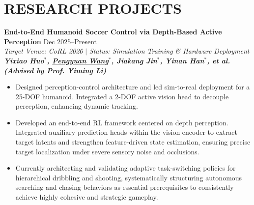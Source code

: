 \documentclass[a4paper,11pt]{article}
\begin{document}
\section{RESEARCH PROJECTS}

\textcolor{titleblue}{\textbf{End-to-End Humanoid Soccer Control via Depth-Based Active Perception}} \hfill Dec 2025--Present \\
\textit{Target Venue: CoRL 2026} $|$ \textit{Status: Simulation Training \& Hardware Deployment} \\
\textit{\textbf{Yixiao Huo$^*$, \underline{Pengyuan Wang$^*$}, Jiakang Jin$^*$, Yinan Han$^*$, et al. (Advised by Prof. Yiming Li)}}
\begin{itemize}[nosep,after=\strut, leftmargin=1.5em, itemsep=3pt,label=$\bullet$]
\item Designed perception-control architecture and led sim-to-real deployment for a 25-DOF humanoid. Integrated a 2-DOF active vision head to decouple perception, enhancing dynamic tracking.
\item Developed an end-to-end RL framework centered on depth perception. Integrated auxiliary prediction heads within the vision encoder to extract target latents and strengthen feature-driven state estimation, ensuring precise target localization under severe sensory noise and occlusions.
\item Currently architecting and validating adaptive task-switching policies for hierarchical dribbling and shooting, systematically structuring autonomous searching and chasing behaviors as essential prerequisites to consistently achieve highly cohesive and strategic gameplay.
\end{itemize}

\vspace{6pt}
\end{document}
